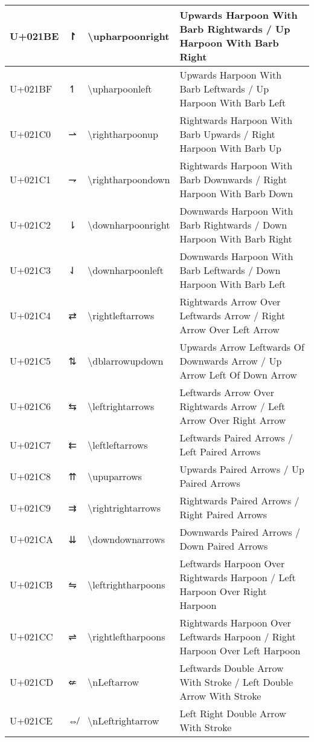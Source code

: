 \begin{table}[h]
\begin{tabulary}{\linewidth}{|L|L|L|L|}
\hline
U+021BE & ↾ & {\textbackslash}upharpoonright & Upwards Harpoon With Barb Rightwards / Up Harpoon With Barb Right \\
\hline
U+021BF & ↿ & {\textbackslash}upharpoonleft & Upwards Harpoon With Barb Leftwards / Up Harpoon With Barb Left \\
\hline
U+021C0 & ⇀ & {\textbackslash}rightharpoonup & Rightwards Harpoon With Barb Upwards / Right Harpoon With Barb Up \\
\hline
U+021C1 & ⇁ & {\textbackslash}rightharpoondown & Rightwards Harpoon With Barb Downwards / Right Harpoon With Barb Down \\
\hline
U+021C2 & ⇂ & {\textbackslash}downharpoonright & Downwards Harpoon With Barb Rightwards / Down Harpoon With Barb Right \\
\hline
U+021C3 & ⇃ & {\textbackslash}downharpoonleft & Downwards Harpoon With Barb Leftwards / Down Harpoon With Barb Left \\
\hline
U+021C4 & ⇄ & {\textbackslash}rightleftarrows & Rightwards Arrow Over Leftwards Arrow / Right Arrow Over Left Arrow \\
\hline
U+021C5 & ⇅ & {\textbackslash}dblarrowupdown & Upwards Arrow Leftwards Of Downwards Arrow / Up Arrow Left Of Down Arrow \\
\hline
U+021C6 & ⇆ & {\textbackslash}leftrightarrows & Leftwards Arrow Over Rightwards Arrow / Left Arrow Over Right Arrow \\
\hline
U+021C7 & ⇇ & {\textbackslash}leftleftarrows & Leftwards Paired Arrows / Left Paired Arrows \\
\hline
U+021C8 & ⇈ & {\textbackslash}upuparrows & Upwards Paired Arrows / Up Paired Arrows \\
\hline
U+021C9 & ⇉ & {\textbackslash}rightrightarrows & Rightwards Paired Arrows / Right Paired Arrows \\
\hline
U+021CA & ⇊ & {\textbackslash}downdownarrows & Downwards Paired Arrows / Down Paired Arrows \\
\hline
U+021CB & ⇋ & {\textbackslash}leftrightharpoons & Leftwards Harpoon Over Rightwards Harpoon / Left Harpoon Over Right Harpoon \\
\hline
U+021CC & ⇌ & {\textbackslash}rightleftharpoons & Rightwards Harpoon Over Leftwards Harpoon / Right Harpoon Over Left Harpoon \\
\hline
U+021CD & ⇍ & {\textbackslash}nLeftarrow & Leftwards Double Arrow With Stroke / Left Double Arrow With Stroke \\
\hline
U+021CE & ⇎ & {\textbackslash}nLeftrightarrow & Left Right Double Arrow With Stroke \\

\end{tabulary}
\end{table}
